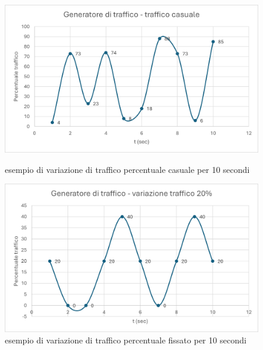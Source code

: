 \documentclass[binding=0.6cm]{sapthesis}
\begin{document}
\begin{figure}[ht]
    \centering
    \begin{minipage}{0.48\textwidth}
      \includegraphics[width=\linewidth]{immagini/generatore_traffico_random.png}
      \caption{esempio di variazione di traffico percentuale casuale per 10 secondi}
      \label{fig:generatore_traffico_random}
    \end{minipage}\hfill
    \begin{minipage}{0.48\textwidth}
      \includegraphics[width=\linewidth]{immagini/generatore_traffico_fissato.png}
      \caption{esempio di variazione di traffico percentuale fissato per 10 secondi}
      \label{fig:generatore_traffico_fissato}
    \end{minipage}
\end{figure}
\end{document}
